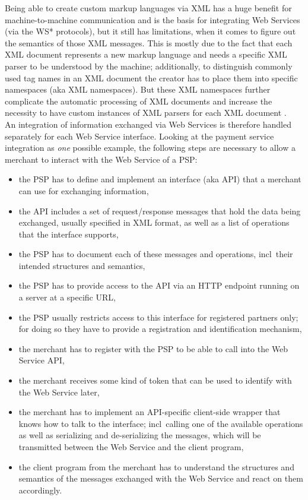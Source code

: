 Being able to create custom markup languages via \gls{XML} has a huge benefit for machine-to-machine communication and is the basis for integrating Web Services (via the WS* protocols), but it still has limitations, when it comes to figure out the semantics of those \gls{XML} messages. This is mostly due to the fact that each \gls{XML} document represents a new markup language and needs a specific \gls{XML} parser to be understood by the machine; additionally, to distinguish commonly used tag names in an \gls{XML} document the creator has to place them into specific namespaces (aka \gls{XML} namespaces). But these \gls{XML} namespaces further complicate the automatic processing of \gls{XML} documents and increase the necessity to have custom instances of \gls{XML} parsers for each \gls{XML} document \citep{taylor2008p2p}. \\

An integration of information exchanged via Web Services is therefore handled separately for each Web Service interface. Looking at the payment service integration as \emph{one} possible example, the following steps are necessary to allow a merchant to interact with the Web Service of a \gls{PSP}: \@

\begin{itemize}
  \item the \gls{PSP} has to define and implement an interface (aka \gls{API}) that a merchant can use for exchanging information,
  \item the \gls{API} includes a set of request/response messages that hold the data being exchanged, usually specified in \gls{XML} format, as well as a list of operations that the interface supports,
  \item the \gls{PSP} has to document each of these messages and operations, \gls{incl}\ their intended structures and semantics,
  \item the \gls{PSP} has to provide access to the \gls{API} via an \gls{HTTP} endpoint running on a server at a specific \gls{URL},
  \item the \gls{PSP} usually restricts access to this interface for registered partners only; for doing so they have to provide a registration and identification mechanism,
  \item the merchant has to register with the \gls{PSP} to be able to call into the Web Service \gls{API},
  \item the merchant receives some kind of token that can be used to identify with the Web Service later,
  \item the merchant has to implement an \gls{API}-specific client-side wrapper that knows how to talk to the interface; \gls{incl}\ calling one of the available operations as well as serializing and de-serializing the messages, which will be transmitted between the Web Service and the client program,
  \item the client program from the merchant has to understand the structures and semantics of the messages exchanged with the Web Service and react on them accordingly.
\end{itemize}

